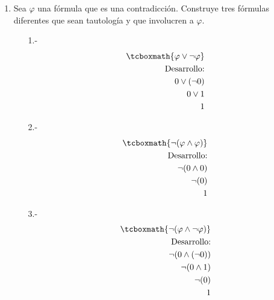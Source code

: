 \documentclass[10pt,letterpaper]{article}
\begin{document}
\begin{enumerate}
    \clearpage
    \item Sea $\varphi$ una fórmula que es una contradicción. Construye tres fórmulas
    diferentes que sean tautología y que involucren a $\varphi$.
        \begin{enumerate}
            \item [1.-]
                \begin{equation*} \begin{split}
                    \tcboxmath{\varphi \lor \neg \varphi} \\
                    \text{Desarrollo:} \\
                    0 \lor (\neg 0) \\
                    0 \lor 1 \\
                    1 \\
                \end{split} \end{equation*}

            \item [2.-]
                \begin{equation*} \begin{split}
                    \tcboxmath{\neg(\varphi \land \varphi)} \\
                    \text{Desarrollo:} \\
                    \neg (0 \land 0) \\
                    \neg (0) \\
                    1 \\
                \end{split} \end{equation*}

            \item [3.-]
                \begin{equation*} \begin{split}
                    \tcboxmath{\neg(\varphi \land \neg \varphi)} \\
                    \text{Desarrollo:} \\
                    \neg(0 \land (\neg 0)) \\
                    \neg(0 \land 1) \\
                    \neg(0) \\
                    1 \\
                \end{split} \end{equation*}
        \end{enumerate}
\end{enumerate}
\end{document}
